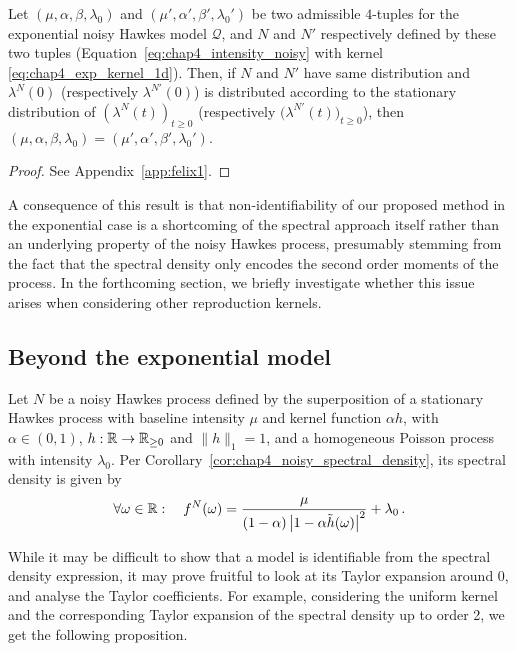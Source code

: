 \begin{proposition}\label{prop:chap4_statN_identifiability}
	Let $(\mu, \alpha, \beta, \lambda_0)$ and $(\mu', \alpha', \beta', \lambda_0')$ be two admissible $4$-tuples for the exponential noisy Hawkes model $\mathcal Q$,
	and $N$ and $N'$ respectively defined by these two tuples (Equation~\eqref{eq:chap4_intensity_noisy} with kernel \eqref{eq:chap4_exp_kernel_1d}).
	Then,
	if $N$ and $N'$ have same distribution
	and $\lambda^N(0)$ (respectively $\lambda^{N'}(0)$) is distributed according to the stationary distribution of $\left( \lambda^N(t) \right)_{t \ge 0}$ (respectively $\bigl( \lambda^{N'}(t) \bigr)_{t \ge 0}$),
	then $(\mu, \alpha, \beta, \lambda_0) = (\mu', \alpha', \beta', \lambda_0')$.
\end{proposition} 
\begin{proof}
  See Appendix~\ref{app:felix1}.
\end{proof}

A consequence of this result is that non-identifiability of our proposed method in the exponential case is a shortcoming of the spectral approach itself rather than an underlying property of the noisy Hawkes process, presumably stemming from the fact that the spectral density only encodes the second order moments of the process.
In the forthcoming section, we briefly investigate whether this issue arises when considering other reproduction kernels.
                
        
      \subsection{Beyond the exponential model}
        Let $N$ be a noisy Hawkes process defined by the superposition of a stationary 	Hawkes process with baseline intensity $\mu$ and kernel function $\alpha h$, with $\alpha \in (0,1)$, $h : {\mathbb R} \to {\mathbb R}_{\ge 0}$ and $\|h\|_1 = 1$, and a homogeneous Poisson process with intensity $\lambda_0$.
Per Corollary~\ref{cor:chap4_noisy_spectral_density}, its spectral density is given by
\begin{equation*}
  \forall \omega \in {\mathbb R}: \quad
	f^N(\omega) = \frac{\mu}{(1 - \alpha) \left \lvert 1 - \alpha \tilde h(\omega) \right \rvert^2} + \lambda_0 \,.
\end{equation*}

While it may be difficult to show that a model is identifiable from the spectral density expression, it may prove fruitful to look at its Taylor expansion around 0, and analyse the Taylor coefficients. 
For example, considering the uniform kernel and the corresponding Taylor expansion of the spectral density up to order 2, we get the following proposition.


